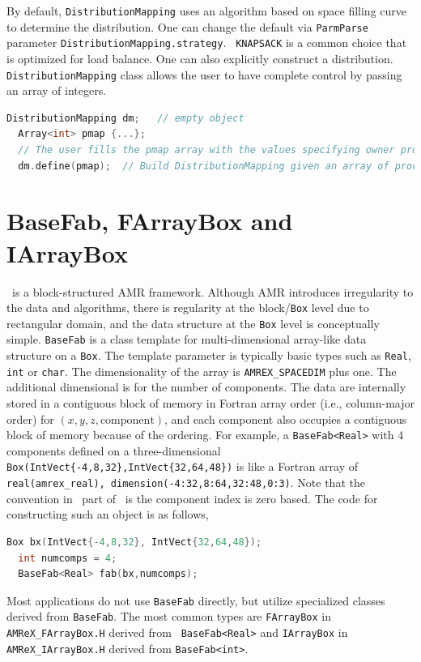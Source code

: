 {By default, {\tt DistributionMapping} uses an algorithm based on space
filling curve to determine the distribution.  One can change the default
via {\tt ParmParse} parameter {\tt DistributionMapping.strategy}.  {\tt
  KNAPSACK} is a common choice that is optimized for load balance.
One can also explicitly construct a distribution.
{\tt DistributionMapping} class allows the user to have complete control by
passing an array of integers. 
\begin{lstlisting}[language=cpp]
  DistributionMapping dm;   // empty object
  Array<int> pmap {...};
  // The user fills the pmap array with the values specifying owner processes
  dm.define(pmap);  // Build DistributionMapping given an array of process IDs.
\end{lstlisting}


\section{BaseFab, FArrayBox and IArrayBox}
\label{sec:basics:fab}

\amrex\ is a block-structured AMR framework.  Although AMR introduces
irregularity to the data and algorithms, there is regularity at the
block/{\tt Box} level due to rectangular domain, and the data structure
at the {\tt Box} level is conceptually simple.  {\tt BaseFab} is a
class template for multi-dimensional array-like data structure on a
{\tt Box}.  The template parameter is typically basic types such as
{\tt Real}, {\tt int} or {\tt char}.  The dimensionality of the array
is {\tt AMREX\_SPACEDIM} plus one.  The additional dimensional is for
the number of components.  The data are internally stored in a
contiguous block of memory in Fortran array order (i.e., column-major
order) for $(x,y,z,\mathrm{component})$, and each component also
occupies a contiguous block of memory because of the ordering.  For
example, a {\tt BaseFab<Real>} with 4 components defined on a
three-dimensional {\tt Box(IntVect\{-4,8,32\},IntVect\{32,64,48\})} is
like a Fortran array of {\tt real(amrex\_real),
  dimension(-4:32,8:64,32:48,0:3)}.  Note that the convention in \cpp\
part of \amrex\ is the component index is zero based.  The code for
constructing such an object is as follows,
\begin{lstlisting}[language=cpp]
  Box bx(IntVect{-4,8,32}, IntVect{32,64,48});
  int numcomps = 4;
  BaseFab<Real> fab(bx,numcomps);
\end{lstlisting}

Most applications do not use {\tt BaseFab} directly, but utilize
specialized classes derived from {\tt BaseFab}.  The most common types
are {\tt FArrayBox} in {\tt AMReX\_FArrayBox.H} derived from {\tt
  BaseFab<Real>} and {\tt IArrayBox} in {\tt AMReX\_IArrayBox.H}
derived from {\tt BaseFab<int>}.

}
